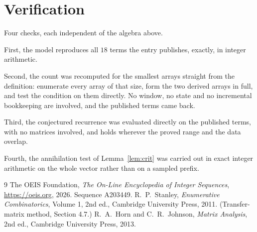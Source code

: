 \documentclass[11pt,a4paper]{article}
\theoremstyle{plain}
\theoremstyle{definition}
\begin{document}
\section{Verification}

Four checks, each independent of the algebra above.

First, the model reproduces all $18$ terms the entry publishes, exactly, in integer
arithmetic.

Second, the count was recomputed for the smallest arrays straight from the definition:
enumerate every array of that size, form the two derived arrays in full, and test the condition
on them directly. No window, no state and no incremental bookkeeping are involved, and the
published terms came back.

Third, the conjectured recurrence was evaluated directly on the published terms, with no
matrices involved, and holds wherever the proved range and the data overlap.

Fourth, the annihilation test of Lemma~\ref{lem:crit} was carried out in exact integer
arithmetic on the whole vector rather than on a sampled prefix.

\begin{thebibliography}{9}
 The OEIS Foundation, \emph{The On-Line Encyclopedia of Integer
Sequences}, \url{https://oeis.org}, 2026. Sequence A203449.
 R.~P.~Stanley, \emph{Enumerative Combinatorics}, Volume 1, 2nd ed.,
Cambridge University Press, 2011. (Transfer-matrix method, Section 4.7.)
 R.~A.~Horn and C.~R.~Johnson, \emph{Matrix Analysis}, 2nd ed., Cambridge
University Press, 2013.
\end{thebibliography}
\end{document}

